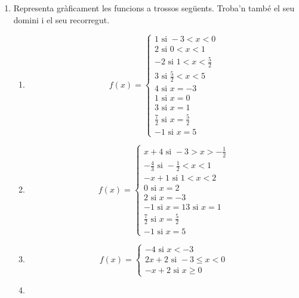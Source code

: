 \documentclass{article}
\begin{document}
	\author{Mireia Dosil}
	\date{text}



\begin{enumerate}
 

\item Representa gràficament les funcions a trossos següents. Troba'n també el seu domini i el seu recorregut.

\begin{enumerate}
	\item 
	$$f(x)=
	\begin{cases}
	1 \mbox{ si } -3 < x < 0 \\
	2 \mbox{ si } 0 < x < 1 \\
	-2 \mbox{ si } 1 < x <\frac{5}{2}\\
	3 \mbox{ si } \frac{5}{2} < x < 5\\
	4 \mbox{ si } x=-3 \\
	1 \mbox{ si } x=0 \\
	3 \mbox{ si } x=1 \\
	\frac{7}{2} \mbox{ si } x=\frac{5}{2} \\
	-1 \mbox{ si } x= 5
	\end{cases}
	$$
	
	\item
	
	$$
	f(x)=
	\begin{cases}
	x+4 \mbox{ si } -3 > x > -\frac{1}{2} \\
	-\frac{4}{3} \mbox{ si } -\frac{1}{2} < x < 1 \\
	-x+1 \mbox{ si } 1 < x <2\\
	0 \mbox{ si } x=2\\
	2 \mbox{ si } x=-3 \\
	-1 \mbox{ si } x=1 
	3 \mbox{ si } x=1 \\
	\frac{7}{2} \mbox{ si } x=\frac{5}{2} \\
	-1 \mbox{ si } x= 5
		\end{cases}
	$$
	
	\item
	
	
	$$
	f(x)=
	\begin{cases}
	-4 \mbox{ si } x < -3 \\
	2x+2 \mbox{ si } -3 \le x < 0 \\
	-x+2 \mbox{ si } x \ge 0
	
	\end{cases}
	$$
	
	
	\item
	

\end{enumerate}
\end{enumerate}
\end{document}
